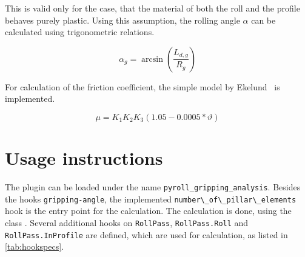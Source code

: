 \documentclass[11pt]{PyRollDocs}
\begin{document}
    This is valid only for the case, that the material of both the roll and the profile behaves purely plastic.
    Using this assumption, the rolling angle $\alpha$ can be calculated using trigonometric relations.

    \begin{equation}
        \alpha_g = \arcsin\left( \frac{L_{d, g}}{R_{g}} \right)
        \label{eq:gripping-angle}
    \end{equation}

    For calculation of the friction coefficient, the simple model by Ekelund~\cite{Ekelund_1927} is implemented.

    \begin{equation}
        \mu = K_1 K_2 K_3 \left( 1.05 - 0.0005 * \vartheta \right)
        \label{eq:ekelund-friction-coefficient-model}
    \end{equation}


    \section{Usage instructions}\label{sec:usage-instructions}

    The plugin can be loaded under the name \texttt{pyroll\_gripping\_analysis}.
    Besides the hooks \lstinline{gripping-angle}, the implemented \lstinline{number\_of\_pillar\_elements} hook is the entry point for the calculation.
    The calculation is done, using the class .
    Several additional hooks on \lstinline{RollPass}, \lstinline{RollPass.Roll} and \lstinline{RollPass.InProfile} are defined, which are used for calculation, as listed in \autoref{tab:hookspecs}.
\end{document}
